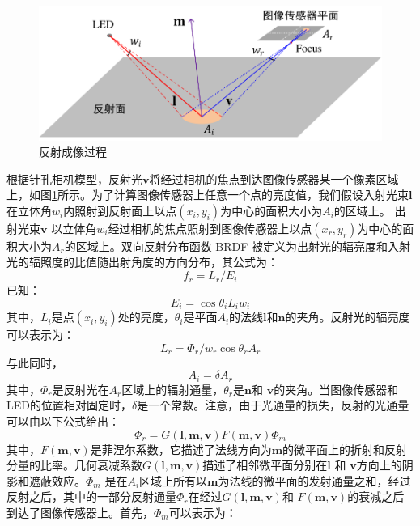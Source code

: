 \begin{figure}[!t]
  \centering
  \includegraphics[width=0.8\linewidth]{FIG/reflected surface.pdf}
  \caption{反射成像过程}
  \label{fig:reflecting_image}
\end{figure}
根据针孔相机模型，反射光$\mathbf{v}$将经过相机的焦点到达图像传感器某一个像素区域上，如图\ref{fig:reflecting_image}所示。为了计算图像传感器上任意一个点的亮度值，我们假设入射光束$\mathbf{l}$在立体角$w_{i}$内照射到反射面上以点$(x_{i},y_{i})$为中心的面积大小为$A_{i}$的区域上。 出射光束$\mathbf{v}$ 以立体角$w_{i}$经过相机的焦点照射到图像传感器上以点$(x_{r},y_{r})$为中心的面积大小为$A_{r}$的区域上。双向反射分布函数 BRDF 被定义为出射光的辐亮度和入射光的辐照度的比值随出射角度的方向分布，其公式为：
\begin{equation}\label{eq:fr}
  f_{r}=L_{r}/E_{i}
\end{equation}
已知：
\begin{equation}\label{eq:dei}
  E_{i}=\cos\theta_{i}L_{i}w_{i}
\end{equation}
其中，$L_{i}$是点$(x_{i},y_{i})$处的亮度，$\theta_{i}$是平面$A_{i}$的法线$\mathbf{l}$和$\mathbf{n}$的夹角。反射光的辐亮度可以表示为：
\begin{equation}\label{eq:dlrdphir}
  L_{r}=\Phi_{r}/w_{r}\cos\theta_{r}A_{r}
\end{equation}
与此同时，
\begin{equation}\label{eq:dArdAi}
  A_{i}=\delta A_{r}
\end{equation}
其中，$\Phi_{r}$是反射光在$A_{r}$区域上的辐射通量，$\theta_{r}$是$\mathbf{n}$和 $\mathbf{v}$的夹角。当图像传感器和LED的位置相对固定时，$\delta$是一个常数。注意，由于光通量的损失，反射的光通量可以由以下公式给出：
\begin{equation}\label{eq:dphirgf}
  \Phi_{r}=G(\mathbf{l},\mathbf{m},\mathbf{v})F(\mathbf{m},\mathbf{v})\Phi_{m}
\end{equation}
其中，$F(\mathbf{m},\mathbf{v})$是菲涅尔系数，它描述了法线方向为$\mathbf{m}$的微平面上的折射和反射分量的比率。几何衰减系数$G(\mathbf{l},\mathbf{m},\mathbf{v})$描述了相邻微平面分别在$\mathbf{l}$ 和 $\mathbf{v}$方向上的阴影和遮蔽效应。$\Phi_{m}$ 是在$A_{i}$区域上所有以$\mathbf{m}$为法线的微平面的发射通量之和，经过反射之后，其中的一部分反射通量$\Phi_{r}$在经过$G(\mathbf{l},\mathbf{m},\mathbf{v})$和 $F(\mathbf{m},\mathbf{v})$的衰减之后到达了图像传感器上。首先，$\Phi_{m}$可以表示为：
